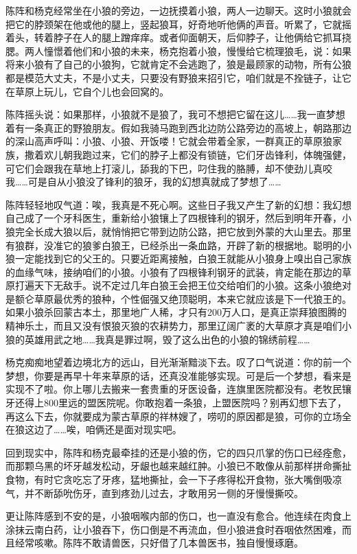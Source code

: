 \par 陈阵和杨克经常坐在小狼的旁边，一边抚摸着小狼，两人一边聊天。这时小狼就会把它的脖颈架在他或他的腿上，竖起狼耳，好奇地听他俩的声音。听累了，它就摇着头，转着脖子在人的腿上蹭痒痒。或者仰面朝天，后仰脖子，让他俩给它抓耳挠腮。两人憧憬着他们和小狼的未来，杨克抱着小狼，慢慢给它梳理狼毛，说：如果将来小狼有了自己的小狼狗，它就肯定不会逃跑了，狼是最顾家的动物，所有公狼都是模范大丈夫，不是小丈夫，只要没有野狼来招引它，咱们就是不拴链子，让它在草原上玩儿，它自个儿也会回窝的。
\par 陈阵摇头说：如果那样，小狼就不是狼了，我可不想把它留在这儿……我一直梦想着有一条真正的野狼朋友。假如我骑马跑到西北边防公路旁边的高坡上，朝路那边的深山高声呼叫：小狼、小狼、开饭喽！它就会带着全家，一群真正的草原狼家族，撒着欢儿朝我跑过来，它们的脖子上都没有锁链，它们牙齿锋利，体魄强健，可它们会跟我在草地上打滚儿，舔我的下巴，叼住我的胳膊，却不使劲儿真咬我……可是自从小狼没了锋利的狼牙，我的幻想真就成了梦想了……
\par 陈阵轻轻地叹气道：唉，我真是不死心啊。这些日子我又产生了新的幻想：我幻想自己成了一个牙科医生，重新给小狼镶上了四根锋利的钢牙，然后到明年开春，小狼完全长成大狼以后，就悄悄把它带到边防公路，把它放到外蒙的大山里去。那里有狼群，没准它的狼爹白狼王，已经杀出一条血路，开辟了新的根据地。聪明的小狼一定能找到它的父王的。只要近距离接触，白狼王就能从小狼身上嗅出自己家族的血缘气味，接纳咱们的小狼。小狼有了四根锋利钢牙的武装，肯定能在那边的草原打遍天下无敌手。说不定过几年白狼王会把王位交给咱们的小狼。这条小狼绝对是额仑草原最优秀的狼种，个性倔强又绝顶聪明，本来它就应该是下一代狼王的。如果小狼杀回蒙古本土，那里地广人稀，才只有200万人口，是真正崇拜狼图腾的精神乐土，而且又没有恨狼灭狼的农耕势力，那里辽阔广袤的大草原才真是咱们小狼的英雄用武之地……我真是罪过啊，毁了这么出色的小狼的锦绣前程……
\par 杨克痴痴地望着边境北方的远山，目光渐渐黯淡下去。叹了口气说道：你的前一个梦想，你要是再早十年来草原的话，还真没准能够实现。可是后一个梦想，看来是实现不了啦。你上哪儿去搬来一套贵重的牙医设备，连旗里医院都没有。老牧民镶牙还得上800里远的盟医院呢。你敢抱着一条狼，上盟医院吗？别再幻想下去了，再这么下去，你就要成为蒙古草原的祥林嫂了，唠叨的原因都是狼，可你的立场全在狼这边了……唉，咱俩还是面对现实吧。
\par 回到现实中，陈阵和杨克最牵挂的还是小狼的伤，它的四只爪掌的伤口已经痊愈，而那颗乌黑的坏牙越发松动，牙龈也越来越红肿。小狼已不敢像从前那样拼命撕扯食物，有时它贪吃忘了牙疼，猛地撕扯，会一下子疼得松开食物，张大嘴倒吸凉气，并不断舔吮伤牙，直到疼劲儿过去，才敢用另一侧的牙慢慢撕咬。
\par 更让陈阵感到不安的是，小狼咽喉内部的伤口，也一直没有愈合。他连续在肉食上涂抹云南白药，让小狼吞下，伤口倒是不再流血，但小狼进食时吞咽依然困难，而且经常咳嗽。陈阵不敢请兽医，只好借了几本兽医书，独自慢慢琢磨。

